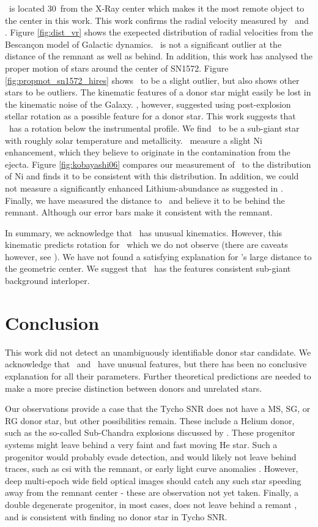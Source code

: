 \starg\ is located 30\arcsec\ from the X-Ray center which makes it the most remote object to the center in this work. This work confirms the radial velocity measured by \gh\ and \wek. Figure \ref{fig:dist_vr} shows the exepected distribution of radial velocities from the Bescan\c{c}on model of Galactic dynamics. \starg\ is not a significant outlier at the distance of the remnant as well as behind. 
In addition, this work has analysed the proper motion of stars around the center of SN1572. Figure \ref{fig:propmot_sn1572_hires} shows \starg\ to be a slight outlier, but also shows other stars to be outliers.
The kinematic features of a donor star might easily be lost in the kinematic noise of the Galaxy. \wek, however, suggested using post-explosion stellar rotation as a possible feature for a donor star. This work suggests that \starg\ has a rotation below the instrumental profile. 
We find \starg\ to be a sub-giant star with roughly solar temperature and metallicity.
\gh\ measure a slight Ni enhancement, which they believe to originate in the contamination from the ejecta. Figure \ref{fig:kobayashi06} compares our measurement of \starg\ to the distribution of Ni and finds it to be consistent with this distribution. In addition, we could not measure a significantly enhanced Lithium-abundance as suggested in \gh. 
Finally, we have measured the distance to \starg\ and believe it to be behind the remnant. Although our error bars make it consistent with the remnant.

In summary, we acknowledge that \starg\ has unusual kinematics. However, this kinematic predicts rotation for \starg\ which we do not observe (there are caveats however, see \wek). We have not  found a satisfying explanation for \starg's large distance to the geometric center. We suggest that \starg\, has the features consistent sub-giant background interloper.

\section{Conclusion}
\label{sec:conclusion}
This work did not detect an unambiguously identifiable donor star candidate. We acknowledge that \starb\ and \starg\ have unusual features, but there has been no conclusive explanation for all their parameters. Further theoretical predictions are needed to make a more precise distinction between donors and unrelated stars. 
 
Our observations provide a case that the Tycho SNR does not have a MS, SG, or RG donor star, but other possibilities remain. These include a Helium donor, such as the so-called Sub-Chandra explosions discussed by \cite{1995ApJ...452...62L, 2010ApJ...714L..52S}. These progenitor systems might leave behind a very faint and fast moving He star. Such a progenitor would probably evade detection, and would likely not leave behind traces, such as \gls{csi} with the remnant, or early light curve anomalies \citep{2010ApJ...708.1025K}. However, deep multi-epoch wide field optical images should catch any such star speeding away from the remnant center - these are observation not yet taken.
 Finally, a double degenerate progenitor, in most cases, does not leave behind a remant , and is consistent with finding no donor star in Tycho SNR. 
 
